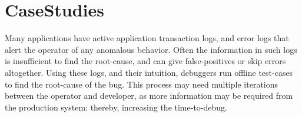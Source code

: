 \section{CaseStudies}
\label{sec:casestudy}



Many applications have active application transaction logs, and error logs that alert the operator of any anomalous behavior.
Often the information in such logs is insufficient to find the root-cause, and can give false-positives or skip errors altogether.
Using these logs, and their intuition, debuggers run offline test-cases to find the root-cause of the bug. 
This process may need multiple iterations between the operator and developer, as more information may be required from the production system: thereby, increasing the time-to-debug. 

